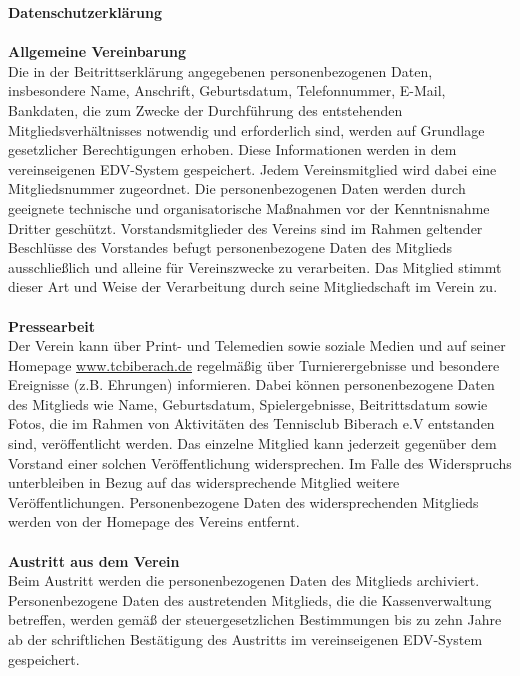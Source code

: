 \begin{Form}
	{
		\huge
		\centering
		\textbf{Datenschutzerklärung}\\\ \\
	}
	\noindent
	\textbf{\Large Allgemeine Vereinbarung}\\
	Die in der Beitrittserklärung angegebenen personenbezogenen Daten, insbesondere Name, Anschrift, Geburtsdatum, Telefonnummer, E-Mail, Bankdaten, die zum Zwecke der Durchführung des entstehenden Mitgliedsverhältnisses notwendig und erforderlich sind, werden auf Grundlage gesetzlicher Berechtigungen erhoben. Diese Informationen werden in dem vereinseigenen EDV-System gespeichert. Jedem Vereinsmitglied wird dabei eine Mitgliedsnummer zugeordnet. Die personenbezogenen Daten werden durch geeignete technische und organisatorische Maßnahmen vor der Kenntnisnahme Dritter geschützt. Vorstandsmitglieder des Vereins sind im Rahmen geltender Beschlüsse des Vorstandes befugt personenbezogene Daten des Mitglieds ausschließlich und alleine für Vereinszwecke zu verarbeiten. Das Mitglied stimmt dieser Art und Weise der Verarbeitung durch seine Mitgliedschaft im Verein zu.\\\\
	\noindent
	\textbf{\Large Pressearbeit}\\
	Der Verein kann über Print- und Telemedien sowie soziale Medien und auf seiner Homepage \url{www.tcbiberach.de} regelmäßig über Turnierergebnisse und besondere Ereignisse (z.B. Ehrungen) informieren.	Dabei können personenbezogene Daten des Mitglieds wie Name, Geburtsdatum, Spielergebnisse, Beitrittsdatum sowie Fotos, die im Rahmen von Aktivitäten des Tennisclub Biberach e.V entstanden sind, veröffentlicht werden. Das einzelne Mitglied kann jederzeit gegenüber dem Vorstand einer solchen Veröffentlichung widersprechen. Im Falle des Widerspruchs unterbleiben in Bezug auf das widersprechende Mitglied weitere Veröffentlichungen. Personenbezogene Daten des widersprechenden Mitglieds werden von der Homepage des Vereins entfernt.\\\\
	\noindent
	\textbf{\Large Austritt aus dem Verein}\\
	Beim Austritt werden die personenbezogenen Daten des Mitglieds archiviert. Personenbezogene Daten des austretenden Mitglieds, die die Kassenverwaltung betreffen, werden gemäß der steuergesetzlichen Bestimmungen bis zu zehn Jahre ab der schriftlichen Bestätigung des Austritts im vereinseigenen EDV-System gespeichert.\\\\

\end{Form}
